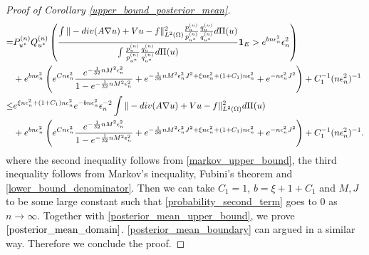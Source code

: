 \documentclass[10pt,a4paper]{amsart}
\renewcommand{\div}{\textnormal{div}}
\begin{document}
\begin{proof}[Proof of Corollary \ref{upper_bound_posterior_mean}]
\begin{equation}
\begin{aligned}
        = &  P_{u^*}^{(n)} Q_{u^*}^{(n)} \left( \frac{\int \|-\div(A \nabla u) + V u -f\|_{L^2(\Omega)}^2 \frac{p_{u}^{(n)}}{p_{u^*}^{(n)}} \frac{q_{u}^{(n)}}{q_{u^*}^{(n)}} d \Pi(u)}{\int \frac{p_{u}^{(n)}}{p_{u^*}^{(n)}} \frac{q_{u}^{(n)}}{q_{u^*}^{(n)}} d \Pi(u)} \mathbf{1}_E > e^{b n \epsilon_n^2} \epsilon_n^2 \right) \\
        & + e^{b n\epsilon_n^2} \left(e^{C n \epsilon_n^2} \frac{e^{-\frac{1}{32}n M^2 \epsilon_n^2}}{1 - e^{-\frac{1}{32}n M^2 \epsilon_n^2}} + e^{-\frac{1}{36} n M^2 \epsilon_{n}^2 J^2 + \xi n\epsilon_n^2 + (1+C_1) n \epsilon_n^2} + e^{-  n\epsilon_n^2 J^2}\right) + C_1^{-1} (n \epsilon_n^2)^{-1} \\
        \leq & e^{\xi n\epsilon_n^2 + (1+C_1) n \epsilon_n^2} e^{-b n\epsilon_n^2} \epsilon_n^{-2} \int \|-\div(A \nabla u) + V u -f\|_{L^2(\Omega)}^2 d \Pi(u) \\
        & + e^{b n\epsilon_n^2} \left(e^{C n \epsilon_n^2} \frac{e^{-\frac{1}{32}n M^2 \epsilon_n^2}}{1 - e^{-\frac{1}{32}n M^2 \epsilon_n^2}} + e^{-\frac{1}{36} n M^2 \epsilon_{n}^2 J^2 + \xi n\epsilon_n^2 + (1+C_1) n \epsilon_n^2} + e^{-  n\epsilon_n^2 J^2}\right) + C_1^{-1} (n \epsilon_n^2)^{-1}. 
    \end{aligned}
\end{equation}
where the second inequality follows from \eqref{markov_upper_bound}, the third inequality follows from Markov's inequality, Fubini's theorem and \eqref{lower_bound_denominator}. Then we can take $C_1 = 1$, $b = \xi + 1 + C_1$ and $M, J$ to be some large constant such that  \eqref{probability_second_term} goes to $0$ as $n \to \infty$. Together with \eqref{posterior_mean_upper_bound}, we prove $\eqref{posterior_mean_domain}$. \eqref{posterior_mean_boundary} can argued in a similar way. Therefore we conclude the proof. 
\end{proof}
\end{document}
